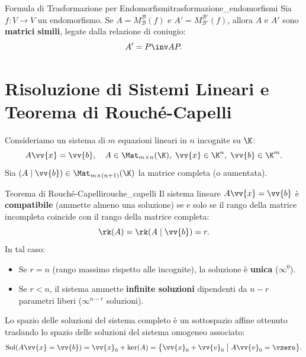 \begin{teorema}{Formula di Trasformazione per Endomorfismi}{trasformazione_endomorfismi}
Sia $f: V \to V$ un endomorfismo. Se $A = M_{\mathcal{B}}^{\mathcal{B}}(f)$ e $A' = M_{\mathcal{B}'}^{\mathcal{B}'}(f)$, allora $A$ e $A'$ sono \textbf{matrici simili}, legate dalla relazione di coniugio:
\begin{equation}
    A' = P\inv A P.
\end{equation}
\end{teorema}

\section{Risoluzione di Sistemi Lineari e Teorema di Rouché-Capelli}
Consideriamo un sistema di $m$ equazioni lineari in $n$ incognite su $\K$:
\begin{equation}
    A \vv{x} = \vv{b}, \quad A \in \Mat_{m \times n}(\K),\; \vv{x} \in \K^n,\; \vv{b} \in \K^m.
\end{equation}
Sia $(A \mid \vv{b}) \in \Mat_{m \times (n+1)}(\K)$ la matrice completa (o aumentata).

\begin{teorema}{Teorema di Rouché-Capelli}{rouche_capelli}
Il sistema lineare $A \vv{x} = \vv{b}$ è \textbf{compatibile} (ammette almeno una soluzione) se e solo se il rango della matrice incompleta coincide con il rango della matrice completa:
\begin{equation}
    \rk(A) = \rk(A \mid \vv{b}) = r.
\end{equation}
In tal caso:
\begin{itemize}
    \item Se $r = n$ (rango massimo rispetto alle incognite), la soluzione è \textbf{unica} ($\infty^0$).
    \item Se $r < n$, il sistema ammette \textbf{infinite soluzioni} dipendenti da $n - r$ parametri liberi ($\infty^{n-r}$ soluzioni).
\end{itemize}
Lo spazio delle soluzioni del sistema completo è un sottospazio affine ottenuto traslando lo spazio delle soluzioni del sistema omogeneo associato:
\begin{equation}
    \operatorname{Sol}(A\vv{x}=\vv{b}) = \vv{x}_0 + \ker(A) = \big\{ \vv{x}_0 + \vv{v}_0 \;\big|\; A\vv{v}_0 = \vzero \big\}.
\end{equation}
\end{teorema}

